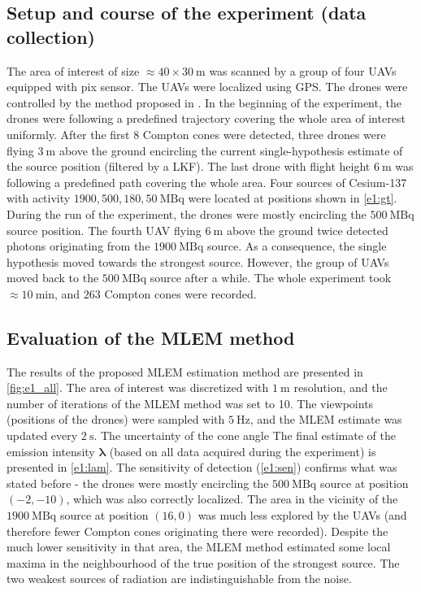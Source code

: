 \subsection{Setup and course of the experiment (data collection)}
The area of interest of size $\approx 40 \times 30\ \si{\meter}$ was scanned by a group of four \ac{UAV}s equipped with \ac{pix} sensor.
The \ac{UAV}s were localized using \ac{GPS}.
The drones were controlled by the method proposed in \cite{baca2021gamma}.
In the beginning of the experiment, the drones were following a predefined trajectory covering the whole area of interest uniformly.
After the first 8 Compton cones were detected, three drones were flying $\SI{3}{\meter}$ above the ground encircling the current single-hypothesis estimate of the source position (filtered by a \ac{LKF}). 
The last drone with flight height $\SI{6}{\meter}$ was following a predefined path covering the whole area.
Four sources of Cesium-137 with activity $1900, 500, 180, 50\ \si{\mega\becquerel}$ were located at positions shown in \autoref{e1:gt}.
During the run of the experiment, the drones were mostly encircling the $\SI{500}{\mega\becquerel}$ source position.
The fourth \ac{UAV} flying $\SI{6}{\meter}$ above the ground twice detected photons originating from the $\SI{1900}{\mega\becquerel}$ source. 
As a consequence, the single hypothesis moved towards the strongest source. However, the group of \ac{UAV}s moved back to the $\SI{500}{\mega\becquerel}$ source after a while.
The whole experiment took $\approx \SI{10}{\minute}$, and $263$ Compton cones were recorded.

\subsection{Evaluation of the MLEM method}
The results of the proposed \ac{MLEM} estimation method are presented in \autoref{fig:e1_all}.
The area of interest was discretized with $\SI{1}{\meter}$ resolution, and the number of iterations of the \ac{MLEM} method was set to 10.
The viewpoints (positions of the drones) were sampled with $\SI{5}{\hertz}$, and the \ac{MLEM} estimate was updated every $\SI{2}{\second}$.
The uncertainty of the cone angle  
The final estimate of the emission intensity $\bm{\lambda}$ (based on all data acquired during the experiment) is presented in \ref{e1:lam}. 
The sensitivity of detection (\ref{e1:sen}) confirms what was stated before - the drones were mostly encircling the $\SI{500}{\mega\becquerel}$ source at position $(-2, -10)$, which was also correctly localized.
The area in the vicinity of the $\SI{1900}{\mega\becquerel}$ source at position $(16, 0)$ was much less explored by the \ac{UAV}s (and therefore fewer Compton cones originating there were recorded).
Despite the much lower sensitivity in that area, the \ac{MLEM} method estimated some local maxima in the neighbourhood of the true position of the strongest source.
The two weakest sources of radiation are indistinguishable from the noise.




